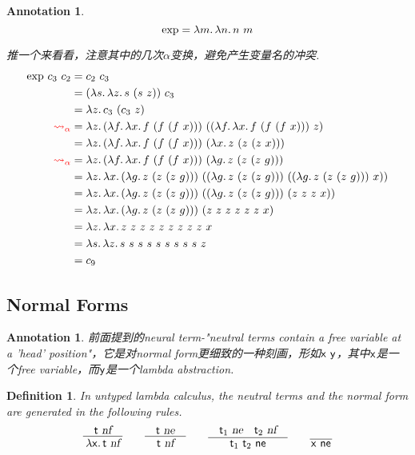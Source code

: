 \documentclass{article}
\theoremstyle{plain}
\newtheorem{definition}[theorem]{Definition}
\newtheorem{annotation}[theorem]{Annotation}
\theoremstyle{nonumberplain}
\newcommand{\lam}[2]{\ensuremath{\lambda #1\ldotp #2}} %
\newcommand{\term}[1]{\ensuremath\mathsf{#1}}
\begin{document}
\begin{annotation} \rm 
$$
\text{exp} = \lam{m}{\lam{n}{n~m}}
$$

推一个来看看，注意其中的几次$\alpha$变换，避免产生变量名的冲突.
$$
\begin{aligned}
\text{exp}~c_3~c_2 &= c_2~c_3 \\
			&= (\lam{s}{\lam{z}{s~(s~z)}})~c_3 \\
			&= \lam{z}{c_3~(c_3~z)} \\
	{\color{red}\leadsto_\alpha} &= \lam{z}{(\lam{f}{\lam{x}{f~(f~(f~x))}})~((\lam{f}{\lam{x}{f~(f~(f~x))}})~z)} \\
			&= \lam{z}{(\lam{f}{\lam{x}{f~(f~(f~x))}})~(\lam{x}{z~(z~(z~x))})} \\
	{\color{red}\leadsto_\alpha} &= \lam{z}{(\lam{f}{\lam{x}{f~(f~(f~x))}})~(\lam{g}{z~(z~(z~g))})} \\
			&= \lam{z}{\lam{x}{(\lam{g}{z~(z~(z~g))})~((\lam{g}{z~(z~(z~g))})~((\lam{g}{z~(z~(z~g))})~x))}} \\
			&= \lam{z}{\lam{x}{(\lam{g}{z~(z~(z~g))})~((\lam{g}{z~(z~(z~g))})~(z~z~z~x))}}\\
			&= \lam{z}{\lam{x}{(\lam{g}{z~(z~(z~g))})~(z~z~z~z~z~z~x)}} \\
			&= \lam{z}{\lam{x}{z~z~z~z~z~z~z~z~z~x}} \\
			&= \lam{s}{\lam{z}{s~s~s~s~s~s~s~s~s~z}} \\
			&= c_9 \\	
\end{aligned}
$$
\end{annotation}

\newpage
\subsection{Normal Forms}

\begin{annotation}
\rm 前面提到的neural term-"neutral terms contain a free variable at a 'head' position"，它是对normal form更细致的一种刻画，形如$\term{x}~\term{y}$，其中$\term{x}$是一个free variable，而$\term{y}$是一个lambda abstraction. 
\end{annotation}

\begin{definition}
\rm In untyped lambda calculus, the neutral terms and the normal form are generated in the following rules.
$$
\begin{array}{ccccccc}
\infer{\lam{\term{x}}{\term{t}}~\textsl{nf}}{&\term{t}~\textsl{nf}&} &&
\infer{\term{t}~\textsl{nf}}{&\term{t}~\textsl{ne}&} &&
\infer{\term{t}_1~\term{t}_2~\textsf{ne}}{&\term{t}_1~\textsl{ne}& \term{t}_2~\textsl{nf}&} && \infer{\term{x}~\textsf{ne}}{& &}
\end{array}
$$
\end{definition}
\end{document}
